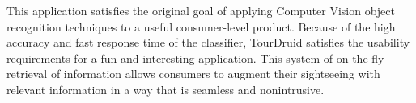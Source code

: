 This application satisfies the original goal of applying Computer Vision object recognition techniques to a useful consumer-level product. Because of the high accuracy and fast response time of the classifier, TourDruid satisfies the usability requirements for a fun and interesting application. This system of on-the-fly retrieval of information allows consumers to augment their sightseeing with relevant information in a way that is seamless and nonintrusive. 